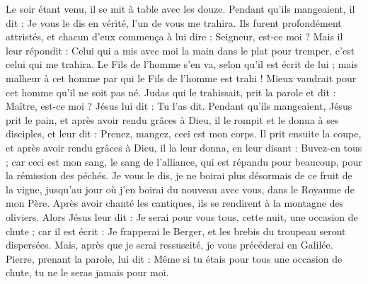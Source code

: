 \begin{multicols}{2}
Le soir étant venu, il se mit à table avec les douze.
Pendant qu’ils mangeaient, il dit : Je vous le dis en vérité, l'un de vous me trahira.
Ils furent profondément attristés, et chacun d'eux commença à lui dire : Seigneur, est-ce moi ?
Mais il leur répondit : Celui qui a mis avec moi la main dans le plat pour tremper, c'est celui qui me trahira.
Le Fils de l'homme s'en va, selon qu'il est écrit de lui ; mais malheur à cet homme par qui le Fils de l'homme est trahi ! Mieux vaudrait pour cet homme qu’il ne soit pas né.
Judas qui le trahissait, prit la parole et dit : Maître, est-ce moi ? Jésus lui dit : Tu l'as dit.
Pendant qu’ils mangeaient, Jésus prit le pain, et après avoir rendu grâces à Dieu, il le rompit et le donna à ses disciples, et leur dit : Prenez, mangez, ceci est mon corps.
Il prit ensuite la coupe, et après avoir rendu grâces à Dieu, il la leur donna, en leur disant : Buvez-en tous ;
car ceci est mon sang, le sang de l’alliance, qui est répandu pour beaucoup, pour la rémission des péchés.
Je vous le dis, je ne boirai plus désormais de ce fruit de la vigne, jusqu'au jour où j’en boirai du nouveau avec vous, dans le Royaume de mon Père.
Après avoir chanté les cantiques{}, ils se rendirent à la montagne des oliviers.
Alors Jésus leur dit : Je serai pour vous tous, cette nuit, une occasion de chute ; car il est écrit : Je frapperai le Berger, et les brebis du troupeau seront dispersées{}.
Mais, après que je serai ressuscité, je vous précéderai en Galilée.
Pierre, prenant la parole, lui dit : Même si tu étais pour tous une occasion de chute, tu ne le seras jamais pour moi.

\end{multicols}
